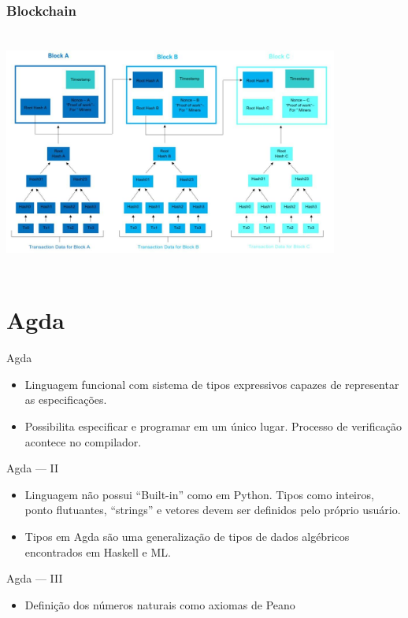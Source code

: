 \documentclass{beamer}
\begin{document}
\begin{frame}
\frametitle{Blockchain}
\includegraphics[width=11cm, height=8cm]{blockchain3}
\end{frame}
 
\section{Agda}

 \begin{frame}{Agda}
 \begin{itemize}
   \item Linguagem funcional com sistema de tipos expressivos capazes de representar as especificações.
     \item Possibilita especificar e programar em um único lugar. Processo de verificação acontece no compilador.
 \end{itemize}
 \end{frame}
 
 \begin{frame}{Agda --- II}
 \begin{itemize}
     \item Linguagem não possui \foreignquote{english}{Built-in} como em Python. Tipos como inteiros, ponto flutuantes, \foreignquote{english}{strings} e vetores devem ser definidos pelo próprio usuário.
     \item Tipos em Agda são uma generalização de tipos de dados algébricos encontrados em Haskell e ML.
 \end{itemize}
 \end{frame}
 
 \begin{frame}{Agda --- III}
\begin{itemize}
  \item Definição dos números naturais como axiomas de Peano
 \end{itemize}
\end{frame}
\end{document}
